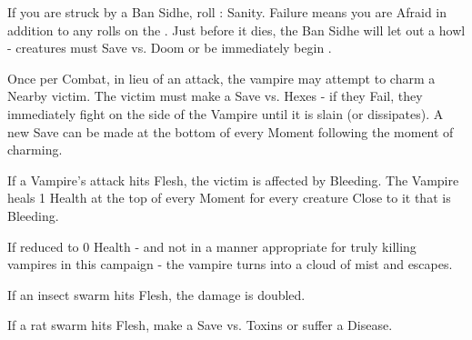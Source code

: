 {\MONSTERBLOCK[
  Name=Ban Sidhe,
  Link=monster-ban-sidhe,
  MV=Base,
  WK=d12,
  DMG=d12 1 Close,
  HD=6,
  Power=Average,
  Soak=0,
  Morale=Orderly,
  Save=4,
  Extras={}
]
If you are struck by a Ban Sidhe, roll \RS : Sanity. Failure means you are Afraid in addition to any rolls on the .  Just before it dies, the Ban Sidhe will let out a howl - creatures must Save vs. Doom or be immediately begin .

\MONSTERBLOCK[
  Name=Vampire,
  Link=monster-vampire,
  MV=Base,
  WK=d10,
  DMG=2d8 All Close,
  HD=7,
  Power=Average,
  Soak=0,
  Morale=Orderly,
  Save=4,
  Extras={Bloodthirsty}
]

Once per Combat, in lieu of an attack, the vampire may attempt to charm a Nearby victim.  The victim must make a Save vs. Hexes - if they Fail, they immediately fight on the side of the Vampire until it is slain (or dissipates).  A new Save can be made at the bottom of every Moment following the moment of charming.

If a Vampire's attack hits Flesh, the victim is affected by Bleeding.  The Vampire heals 1 Health at the top of every Moment for every creature Close to it that is Bleeding.

If reduced to 0 Health - and not in a manner appropriate for truly killing vampires in this campaign - the vampire turns into a cloud of mist and escapes.

\newpage



\MONSTERBLOCK[
  Name=Insect Swarm,
  Link=monster-insect-swarm,
  MV=Base,
  WK=d20,
  DMG=\HD x2 All Close,
  HD=varies,
  Power=Average,
  Soak=0,
  Morale=n/a,
  Save=2,
  Extras={}
]

If an insect swarm hits Flesh, the damage is doubled.

\MONSTERBLOCK[
  Name=Rat Swarm,
  Link=monster-rat-swarm,
  MV=Base,
  WK=d20,
  DMG=\HD x2 All Close,
  HD=varies,
  Power=Average,
  Soak=0,
  Morale=n/a,
  Save=2,
  Extras={}
]

If a rat swarm hits Flesh, make a Save vs. Toxins or suffer a Disease.

}
